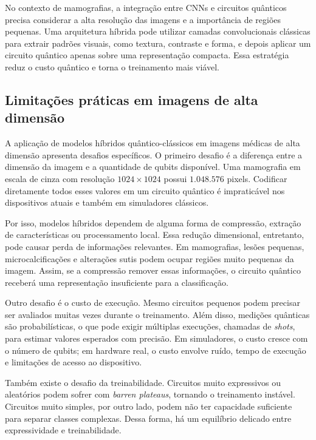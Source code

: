 \documentclass[
    12pt,
    openright,
    oneside,
    a4paper,
    english,
    brazil
]{abntex2}
\begin{document}
No contexto de mamografias, a integração entre CNNs e circuitos quânticos precisa considerar a alta resolução das imagens e a importância de regiões pequenas. Uma arquitetura híbrida pode utilizar camadas convolucionais clássicas para extrair padrões visuais, como textura, contraste e forma, e depois aplicar um circuito quântico apenas sobre uma representação compacta. Essa estratégia reduz o custo quântico e torna o treinamento mais viável.

\subsection{Limitações práticas em imagens de alta dimensão}

A aplicação de modelos híbridos quântico-clássicos em imagens médicas de alta dimensão apresenta desafios específicos. O primeiro desafio é a diferença entre a dimensão da imagem e a quantidade de qubits disponível. Uma mamografia em escala de cinza com resolução \(1024 \times 1024\) possui \(1.048.576\) pixels. Codificar diretamente todos esses valores em um circuito quântico é impraticável nos dispositivos atuais e também em simuladores clássicos.

Por isso, modelos híbridos dependem de alguma forma de compressão, extração de características ou processamento local. Essa redução dimensional, entretanto, pode causar perda de informações relevantes. Em mamografias, lesões pequenas, microcalcificações e alterações sutis podem ocupar regiões muito pequenas da imagem. Assim, se a compressão remover essas informações, o circuito quântico receberá uma representação insuficiente para a classificação.

Outro desafio é o custo de execução. Mesmo circuitos pequenos podem precisar ser avaliados muitas vezes durante o treinamento. Além disso, medições quânticas são probabilísticas, o que pode exigir múltiplas execuções, chamadas de \textit{shots}, para estimar valores esperados com precisão. Em simuladores, o custo cresce com o número de qubits; em hardware real, o custo envolve ruído, tempo de execução e limitações de acesso ao dispositivo.

Também existe o desafio da treinabilidade. Circuitos muito expressivos ou aleatórios podem sofrer com \textit{barren plateaus}, tornando o treinamento instável. Circuitos muito simples, por outro lado, podem não ter capacidade suficiente para separar classes complexas. Dessa forma, há um equilíbrio delicado entre expressividade e treinabilidade.
\end{document}
